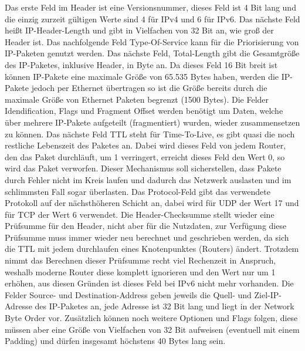 \documentclass[a4paper,14pt,headsepline]{scrartcl}
\begin{document}
Das erste Feld im Header ist eine Versionsnummer, dieses Feld ist 4 Bit lang und die einzig zurzeit gültigen Werte sind 4 für IPv4 und 6 für IPv6. Das nächste Feld heißt IP-Header-Length und gibt in Vielfachen von 32 Bit an, wie groß der Header ist. Das nachfolgende Feld Type-Of-Service kann für die Priorisierung von IP-Paketen genutzt werden. Das nächste Feld, Total-Length gibt die Gesamtgröße des IP-Paketes, inklusive Header, in Byte an. Da dieses Feld 16 Bit breit ist können IP-Pakete eine maximale Größe von 65.535 Bytes haben, werden die IP-Pakete jedoch per Ethernet übertragen so ist die Größe bereits durch die maximale Größe von Ethernet Paketen begrenzt (1500 Bytes). Die Felder Idendification, Flags und Fragment Offset werden benötigt um Daten, welche über mehrere IP-Pakete aufgeteilt (fragmentiert) wurden, wieder zusammensetzen zu können. Das nächste Feld TTL steht für Time-To-Live, es gibt quasi die noch restliche Lebenszeit des Paketes an. Dabei wird dieses Feld von jedem Router, den das Paket durchläuft, um 1 verringert, erreicht dieses Feld den Wert 0, so wird das Paket verworfen. Dieser Mechanismus soll sicherstellen, dass Pakete durch Fehler nicht im Kreis laufen und dadurch das Netzwerk auslasten und im schlimmsten Fall sogar überlasten. Das Protocol-Feld gibt das verwendete Protokoll auf der nächsthöheren Schicht an, dabei wird für UDP der Wert 17 und für TCP der Wert 6 verwendet. Die Header-Checksumme stellt wieder eine Prüfsumme für den Header, nicht aber für die Nutzdaten, zur Verfügung diese Prüfsumme muss immer wieder neu berechnet und geschrieben werden, da sich die TTL mit jedem durchlaufen eines Knotenpunktes (Routers) ändert. Trotzdem nimmt das Berechnen dieser Prüfsumme recht viel Rechenzeit in Anspruch, weshalb moderne Router diese komplett ignorieren und den Wert nur um 1 erhöhen, aus diesen Gründen ist dieses Feld bei IPv6 nicht mehr vorhanden. Die Felder Source- und Destination-Address geben jeweils die Quell- und Ziel-IP-Adresse des IP-Paketes an, jede Adresse ist 32 Bit lang und liegt in der Network Byte Order vor. Zusätzlich können noch weitere Optionen und Flags folgen, diese müssen aber eine Größe von Vielfachen von 32 Bit aufweisen (eventuell mit einem Padding) und dürfen insgesamt höchstens 40 Bytes lang sein.

\newpage
\end{document}

